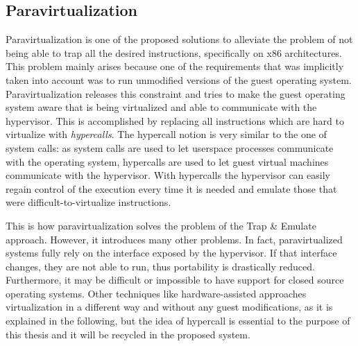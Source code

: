\subsection{Paravirtualization}
Paravirtualization is one of the proposed solutions to alleviate the problem of not being able to trap all the desired instructions, specifically on x86 architectures. This problem mainly arises because one of the requirements that was implicitly taken into account was to run unmodified versions of the guest operating system. Paravirtualization releases this constraint and tries to make the guest operating system aware that is being virtualized and able to communicate with the hypervisor. This is accomplished by replacing all instructions which are hard to virtualize with \emph{hypercalls}. The hypercall notion is very similar to the one of system calls: as system calls are used to let userspace processes communicate with the operating system, hypercalls are used to let guest virtual machines communicate with the hypervisor. With hypercalls the hypervisor can easily regain control of the execution every time it is needed and emulate those that were difficult-to-virtualize instructions. 
\par This is how paravirtualization solves the problem of the Trap \& Emulate approach. However, it introduces many other problems. In fact, paravirtualized systems fully rely on the interface exposed by the hypervisor. If that interface changes, they are not able to run, thus portability is drastically reduced. Furthermore, it may be difficult or impossible  to have support for closed source operating systems.
Other techniques like hardware-assisted approaches virtualization in a different way and without any guest modifications, as it is explained in the following, but the idea of hypercall is essential to the purpose of this thesis and it will be recycled in the proposed system. 

